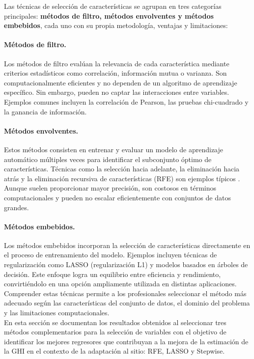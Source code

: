 Las técnicas de selección de características se agrupan en tres categorías principales: \textbf{métodos de filtro, métodos envolventes y métodos embebidos}, cada uno con su propia metodología, ventajas y limitaciones:  

\paragraph{Métodos de filtro.} Los métodos de filtro evalúan la relevancia de cada característica mediante criterios estadísticos como correlación, información mutua o varianza. Son computacionalmente eficientes y no dependen de un algoritmo de aprendizaje específico. Sin embargo, pueden no captar las interacciones entre variables. Ejemplos comunes incluyen la correlación de Pearson, las pruebas chi-cuadrado y la ganancia de información.  

\paragraph{Métodos envolventes.} Estos métodos consisten en entrenar y evaluar un modelo de aprendizaje automático múltiples veces para identificar el subconjunto óptimo de características. Técnicas como la selección hacia adelante, la eliminación hacia atrás y la eliminación recursiva de características (RFE) son ejemplos típicos \cite{Che2024b,liu2024}. Aunque suelen proporcionar mayor precisión, son costosos en términos computacionales y pueden no escalar eficientemente con conjuntos de datos grandes.  

\paragraph{Métodos embebidos.} Los métodos embebidos incorporan la selección de características directamente en el proceso de entrenamiento del modelo. Ejemplos incluyen técnicas de regularización como LASSO (regularización L1) y modelos basados en árboles de decisión. Este enfoque logra un equilibrio entre eficiencia y rendimiento, convirtiéndolo en una opción ampliamente utilizada en distintas aplicaciones. \\

Comprender estas técnicas permite a los profesionales seleccionar el método más adecuado según las características del conjunto de datos, el dominio del problema y las limitaciones computacionales.\\

En esta sección se documentan los resultados obtenidos al seleccionar tres métodos complementarios para la selección de variables con el objetivo de identificar los mejores regresores que contribuyan a la mejora de la estimación de la GHI en el contexto de la adaptación al sitio: RFE, LASSO y Stepwise.  

